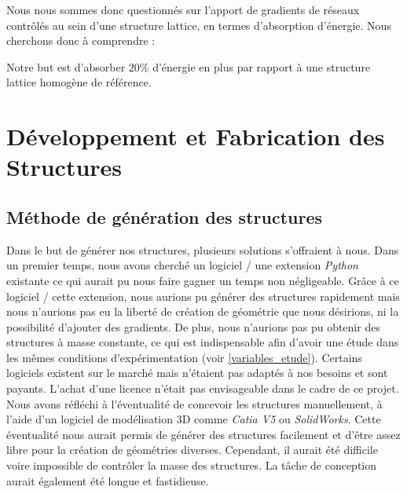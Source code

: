\documentclass[a4paper]{article}
\begin{document}
	Nous nous sommes donc questionnés sur l’apport de gradients de réseaux contrôlés au sein d’une structure lattice, en termes d’absorption d’énergie. Nous cherchons donc à comprendre :
	
	\begin{center}
	\end{center}
	
	Notre but est d'absorber $20\%$ d'énergie en plus par rapport à une structure lattice homogène de référence.
	\newpage
	
	\section{Développement et Fabrication des Structures}
	\subsection{Méthode de génération des structures}
	\hspace{0.5cm}Dans le but de générer nos structures, plusieurs solutions s’offraient à nous. Dans un premier temps, nous avons cherché un logiciel / une extension \textit{Python} existante ce qui aurait pu nous faire gagner un temps non négligeable. Grâce à ce logiciel / cette extension, nous aurions pu générer des structures rapidement mais nous n’aurions pas eu la liberté de création de géométrie que nous désirions, ni la possibilité d’ajouter des gradients. De plus, nous n’aurions pas pu obtenir des structures à masse constante, ce qui est indispensable afin d’avoir une étude dans les mêmes conditions d’expérimentation (voir \ref{variables_etude}). Certains logiciels existent sur le marché mais n’étaient pas adaptés à nos besoins et sont payants. L’achat d’une licence n’était pas envisageable dans le cadre de ce projet.\\
		
	Nous avons réfléchi à l’éventualité de concevoir les structures manuellement, à l’aide d’un logiciel de modélisation 3D comme \textit{Catia V5} ou \textit{SolidWorks}. Cette éventualité nous aurait permis de générer des structures facilement et d’être assez libre pour la création de géométries diverses. Cependant, il aurait été difficile voire impossible de contrôler la masse des structures. La tâche de conception aurait également été longue et fastidieuse.\\
		
\end{document}
